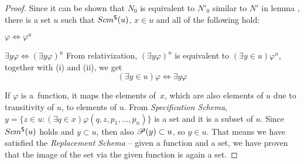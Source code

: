 \begin{proof}
Since it can be shown that $N_0$ is equivalent to $N'_0$ similar to $N'$ in lemma , 
there is a set $u$ such that $Scm^{\sf{S}}(u)$, $x \in u$ and all of the following hold:
\bce[(i)]
\item $\varphi \iff \varphi^{u}$
\item $\exists y \varphi \iff (\exists y \varphi)^{u}$
\ece
From relativization, $(\exists y \varphi)^{u}$ is equivalent to $(\exists y \in u) \varphi^{u}$, together with (i) and (ii), we get
\begin{equation}
(\exists y \in u)\varphi \iff \exists y \varphi
\end{equation}

If $\varphi$ is a~function, %
it maps the elements of~$x$, which are also elements of $u$ due to transitivity of $u$, to elements of $u$. 
From \emph{Specification Schema}, $y = \{ z \in u : (\exists q \in x)\varphi(q, z, p_1, \ldots, p_n)\}$ is a set and it is a subset of $u$. 
Since $Scm^{\sf{S}}(u)$ holds and $y \subset u$, then also $\mathscr{P} (y) \subset u$, so $y \in u$.
That means we have satisfied the \emph{Replacement Schema} – given a function and a set, we have proven that the image of the set via the given function is again a set.
\end{proof} %

